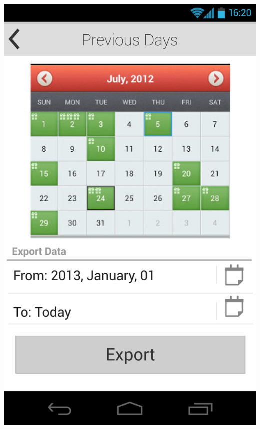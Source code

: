 \documentclass[pdftex,12pt,a4paper]{report}
\begin{document}
\includegraphics[scale=0.18]{Screens/02-Previous--No-Selection.png}
\\\\
\end{document}
